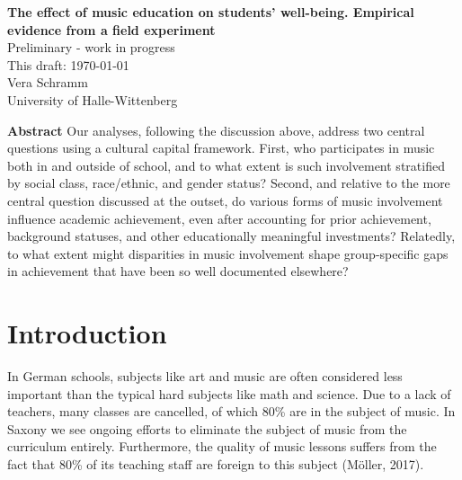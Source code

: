 \documentclass[a4, 12pt]{article}
\begin{document}
\begin{titlepage}
\thispagestyle{empty}%
\begin{center}
\renewcommand{\baselinestretch}{1.0}\normalsize %
\textbf{
The effect of music education on students' well-being. Empirical evidence from a field experiment}\\[1cm]
Preliminary - work in progress \\[1cm]
This draft: \today \\[1cm]
Vera Schramm \\
University of Halle-Wittenberg \\[0.75cm]
 \end{center}


\end{titlepage}

\renewcommand{\baselinestretch}{1}\normalsize

\textbf{\normalsize Abstract}
Our analyses, following the discussion above, address two central questions
using a cultural capital framework. First, who participates in music
both in and outside of school, and to what extent is such involvement
stratified by social class, race/ethnic, and gender status? Second, and relative
to the more central question discussed at the outset, do various forms of
music involvement influence academic achievement, even after accounting
for prior achievement, background statuses, and other educationally meaningful
investments? Relatedly, to what extent might disparities in music
involvement shape group-specific gaps in achievement that have been so well
documented elsewhere?

\clearpage
\tableofcontents

\clearpage
\doublespacing
\pagestyle{plain}

\hypertarget{introduction}{%
\section{Introduction}\label{introduction}}

\label{sec:introduction}

In German schools, subjects like art and music are often considered less important than the typical hard subjects like math and science. Due to a lack of teachers, many classes are cancelled, of which 80\% are in the subject of music. In Saxony we see ongoing efforts to eliminate the subject of music from the curriculum entirely. Furthermore, the quality of music lessons suffers from the fact that 80\% of its teaching staff are foreign to this subject (Möller, 2017).
\end{document}

